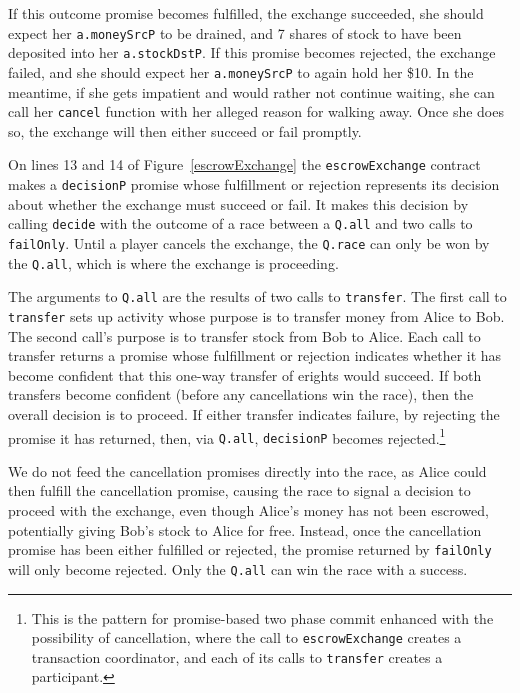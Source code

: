 \documentclass{llncs}
\begin{document}
If this outcome promise becomes fulfilled, the exchange succeeded,  she should expect her {\tt a.moneySrcP} to be drained, and 7 shares of stock to have been deposited into her {\tt a.stockDstP}. If this promise becomes rejected, the exchange failed, and she should expect her {\tt a.moneySrcP} to again hold her \$10. In the meantime, if she gets impatient and would rather not continue waiting, she can call her {\tt cancel} function with her alleged reason for walking away. Once she does so, the exchange will then either succeed or fail promptly.

On lines 13 and 14 of Figure~\ref{escrowExchange} the {\tt escrowExchange} contract makes a {\tt decisionP} promise whose fulfillment or rejection represents its decision about whether the exchange must succeed or fail. It makes this decision by calling {\tt decide} with the outcome of a race between a {\tt Q.all} and two calls to {\tt failOnly}. Until a player cancels the exchange, the {\tt Q.race} can only be won by the {\tt Q.all}, which is where the exchange is proceeding.

The arguments to {\tt Q.all} are the results of two calls to {\tt transfer}. The first call to {\tt transfer} sets up activity whose purpose is to transfer money from Alice to Bob. The second call's purpose is to transfer stock from Bob to Alice. Each call to transfer returns a promise whose fulfillment or rejection indicates whether it has become confident that this one-way transfer of erights would succeed. If both transfers become confident (before any cancellations win the race), then the overall decision is to proceed. If either transfer indicates failure, by rejecting the promise it has returned, then, via {\tt Q.all}, {\tt decisionP} becomes rejected.\footnote{
%
This is the pattern for promise-based two phase commit enhanced with the possibility of cancellation, where the call to {\tt escrowExchange} creates a transaction coordinator, and each of its calls to {\tt transfer} creates a participant.}

We do not feed the cancellation promises directly into the race, as Alice could then fulfill the cancellation promise, causing the race to signal a decision to proceed with the exchange, even though Alice's money has not been escrowed, potentially giving Bob's stock to Alice for free. Instead, once the cancellation promise has been either fulfilled or rejected, the promise returned by {\tt failOnly} will only become rejected. Only the {\tt Q.all} can win the race with a success.
\end{document}
